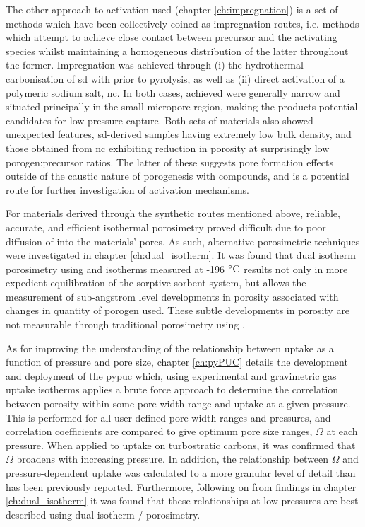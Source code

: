 The other approach to activation used (chapter \ref{ch:impregnation}) is a set of methods which have been collectively coined as impregnation routes, i.e. methods which attempt to achieve close contact between precursor and the activating species whilst maintaining a homogeneous distribution of the latter throughout the former. Impregnation was achieved through (i) the hydrothermal carbonisation of \acrfull{sd} with  prior to pyrolysis, as well as (ii) direct activation of a polymeric sodium salt, \acrfull{nc}. In both cases,  achieved were generally narrow and situated principally in the small \gls{micropore} region, making the products potential candidates for low pressure  capture. Both sets of materials also showed unexpected features, \acrshort{sd}-derived samples having extremely low bulk density, and those obtained from \acrshort{nc} exhibiting reduction in porosity at surprisingly low \gls{porogen}:precursor ratios. The latter of these suggests pore formation effects outside of the caustic nature of \gls{porogenesis} with  compounds, and is a potential route for further investigation of \gls{activation} mechanisms.

For materials derived through the synthetic routes mentioned above, reliable, accurate, and efficient isothermal porosimetry proved difficult due to poor diffusion of  into the materials' pores. As such, alternative porosimetric techniques were investigated in chapter \ref{ch:dual_isotherm}. It was found that dual isotherm porosimetry using  and  isotherms measured at -196 $\rm ^{\circ}C$ results not only in more expedient equilibration of the sorptive-sorbent system, but allows the measurement of sub-angstrom level developments in porosity associated with changes in quantity of \gls{porogen} used. These subtle developments in porosity are not measurable through traditional porosimetry using . 

As for improving the understanding of the relationship between  uptake as a function of pressure and pore size, chapter \ref{ch:pyPUC} details the development and deployment of the \acrfull{pypuc} which, using experimental  and gravimetric gas uptake isotherms applies a brute force approach to determine the correlation between porosity within some pore width range and  uptake at a given pressure. This is performed for all user-defined pore width ranges and pressures, and correlation coefficients are compared to give optimum pore size ranges, $\Omega$ at each pressure. When applied to  uptake on \glspl{turbostratic carbon}, it was confirmed that $\Omega$ broadens with increasing pressure. In addition, the relationship between $\Omega$ and pressure-dependent  uptake was calculated to a more granular level of detail than has been previously reported. Furthermore, following on from findings in chapter \ref{ch:dual_isotherm} it was found that these relationships at low pressures are best described using dual isotherm / porosimetry.
